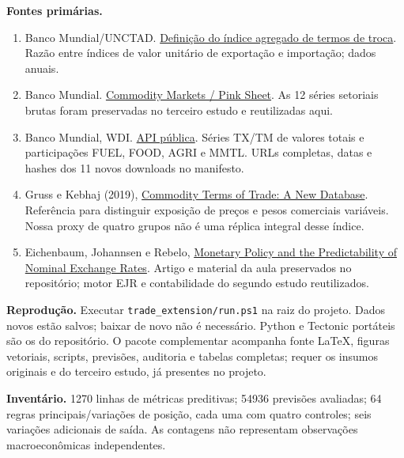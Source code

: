 \documentclass[11pt,a4paper]{article}
\begin{document}
\textbf{Fontes primárias.}
\begin{enumerate}
\item Banco Mundial/UNCTAD. \href{https://databank.worldbank.org/metadataglossary/world-development-indicators/series/TT.PRI.MRCH.XD.WD}{Definição do índice agregado de termos de troca}. Razão entre índices de valor unitário de exportação e importação; dados anuais.
\item Banco Mundial. \href{https://www.worldbank.org/en/research/commodity-markets}{Commodity Markets / Pink Sheet}. As 12 séries setoriais brutas foram preservadas no terceiro estudo e reutilizadas aqui.
\item Banco Mundial, WDI. \href{https://api.worldbank.org/v2/}{API pública}. Séries TX/TM de valores totais e participações FUEL, FOOD, AGRI e MMTL. URLs completas, datas e hashes dos 11 novos downloads no manifesto.
\item Gruss e Kebhaj (2019), \href{https://www.elibrary.imf.org/view/journals/001/2019/021/article-A001-en.xml}{Commodity Terms of Trade: A New Database}. Referência para distinguir exposição de preços e pesos comerciais variáveis. Nossa proxy de quatro grupos não é uma réplica integral desse índice.
\item Eichenbaum, Johannsen e Rebelo, \href{https://www.nber.org/papers/w23158}{Monetary Policy and the Predictability of Nominal Exchange Rates}. Artigo e material da aula preservados no repositório; motor EJR e contabilidade do segundo estudo reutilizados.
\end{enumerate}

\textbf{Reprodução.} Executar \texttt{trade\_extension/run.ps1} na raiz do projeto. Dados novos estão salvos; baixar de novo não é necessário. Python e Tectonic portáteis são os do repositório. O pacote complementar acompanha fonte LaTeX, figuras vetoriais, scripts, previsões, auditoria e tabelas completas; requer os insumos originais e do terceiro estudo, já presentes no projeto.

\textbf{Inventário.} 1270 linhas de métricas preditivas; 54936 previsões avaliadas; 64 regras principais/variações de posição, cada uma com quatro controles; seis variações adicionais de saída. As contagens não representam observações macroeconômicas independentes.
\end{document}
